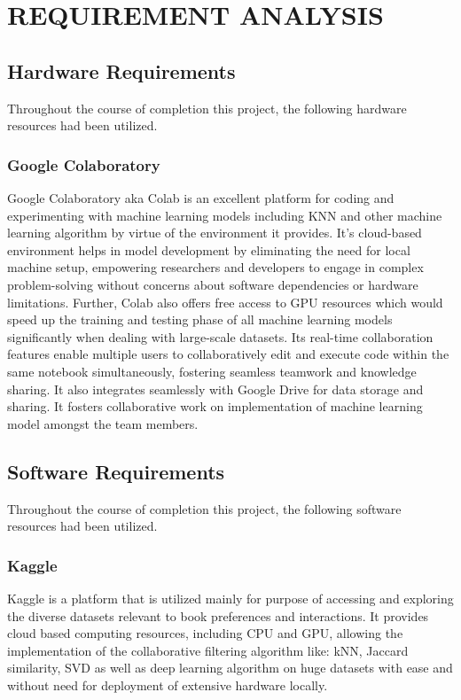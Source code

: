 \chapter{REQUIREMENT ANALYSIS}
    
\section{Hardware Requirements}
Throughout the course of completion this project, the following hardware resources had been utilized.
\subsection*{Google Colaboratory}
Google Colaboratory aka Colab is an excellent platform for coding and experimenting with machine learning models including KNN and other machine learning algorithm by virtue of the environment it provides. It's cloud-based environment helps in model development by eliminating the need for local machine setup, empowering researchers and developers to engage in complex problem-solving without concerns about software dependencies or hardware limitations.
Further, Colab also offers free access to GPU resources which would speed up the training and testing phase of all machine learning models significantly when dealing with large-scale datasets. Its real-time collaboration features enable multiple users to collaboratively edit and execute code within the same notebook simultaneously, fostering seamless teamwork and knowledge sharing. It also integrates seamlessly with Google Drive for data storage and sharing.
It fosters collaborative work on implementation of machine learning model amongst the team members.
\section{Software Requirements}

Throughout the course of completion this project, the following software resources had been utilized.

\subsection*{Kaggle}
Kaggle is a platform that is utilized mainly for purpose of accessing and exploring the diverse datasets relevant to book preferences and interactions.
It provides cloud based computing resources, including CPU and GPU, allowing the implementation of the collaborative filtering algorithm like: kNN, Jaccard similarity, SVD as well as deep learning algorithm on huge datasets with ease and without need for deployment of extensive hardware locally.


